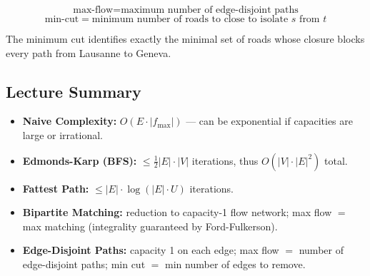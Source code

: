\begin{tcolorbox}[colback=lightgreen, colframe=keygreen, fonttitle=\bfseries,
                  title={Flow/Cut Duality for Edge-Disjoint Paths}]
\[
  \text{max-flow} = \text{maximum number of edge-disjoint paths}
\]
\[
  \text{min-cut} = \text{minimum number of roads to close to isolate }s\text{ from }t
\]
\end{tcolorbox}

The minimum cut identifies exactly the minimal set of roads whose 
closure blocks every path from Lausanne to Geneva.

\subsection{Lecture Summary}

\begin{tcolorbox}[colback=lightblue, colframe=keyblue, fonttitle=\bfseries,
                  title={Key Points}]
\begin{itemize}[noitemsep]
  \item \textbf{Naive Complexity:} $O(E \cdot |f_{\max}|)$ — can be exponential 
        if capacities are large or irrational.
  \item \textbf{Edmonds-Karp (BFS):} $\le \frac{1}{2} |E| \cdot |V|$ iterations, 
        thus $O(|V| \cdot |E|^2)$ total.
  \item \textbf{Fattest Path:} $\le |E| \cdot \log(|E| \cdot U)$ iterations.
  \item \textbf{Bipartite Matching:} reduction to capacity-1 flow network; 
        max flow $=$ max matching (integrality guaranteed by Ford-Fulkerson).
  \item \textbf{Edge-Disjoint Paths:} capacity 1 on each edge; 
        max flow $=$ number of edge-disjoint paths; 
        min cut $=$ min number of edges to remove.
\end{itemize}
\end{tcolorbox}